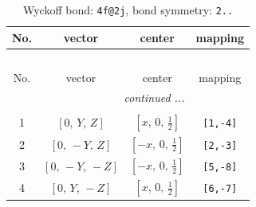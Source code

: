 \documentclass[fleqn,8pt]{jsarticle}
\begin{document}
\renewcommand{\arraystretch}{1.2}
\begin{longtable}{cccc}
\caption{Wyckoff bond: {\tt 4f@2j}, bond symmetry: {\tt 2..}}
 \\
 \hline \hline
No. & vector & center & mapping \\ \hline \endfirsthead

\multicolumn{3}{l}{\tablename\ \thetable{}} \\
 \hline \hline
No. & vector & center & mapping \\ \hline \endhead

 \hline \hline
\multicolumn{3}{r}{\footnotesize\it continued ...} \\ \endfoot

 \hline \hline
\multicolumn{3}{r}{} \\ \endlastfoot

1 & $\left[ 0,\, Y,\, Z \right]$ & $\left[ x,\, 0,\, \frac{1}{2} \right]$ & {\tt [1,-4]} \\ \hline
2 & $\left[ 0,\, - Y,\, Z \right]$ & $\left[ - x,\, 0,\, \frac{1}{2} \right]$ & {\tt [2,-3]} \\ \hline
3 & $\left[ 0,\, - Y,\, - Z \right]$ & $\left[ - x,\, 0,\, \frac{1}{2} \right]$ & {\tt [5,-8]} \\ \hline
4 & $\left[ 0,\, Y,\, - Z \right]$ & $\left[ x,\, 0,\, \frac{1}{2} \right]$ & {\tt [6,-7]} \\
\end{longtable}
\renewcommand{\arraystretch}{1.2}
\end{document}
